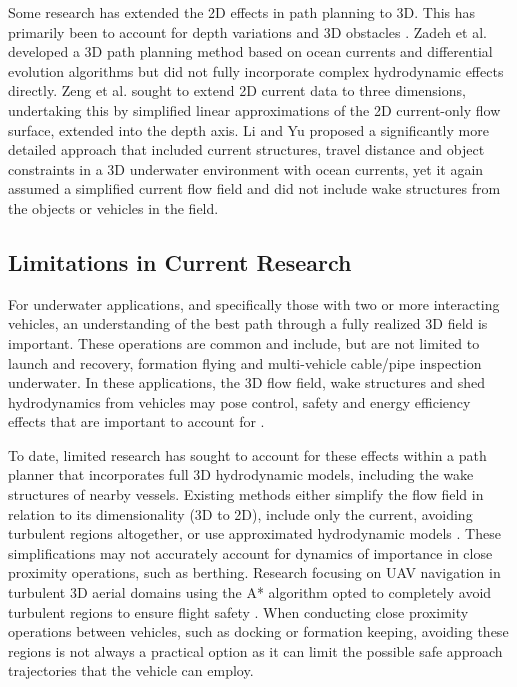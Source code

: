 \documentclass[final,5p,times,twocolumn]{elsarticle}
\begin{document}
Some research has extended the 2D effects in path planning to 3D. This has primarily been to account for depth variations and 3D obstacles \cite{Zadeh2018, Yi2023}. Zadeh et al. \cite{Zadeh2018} developed a 3D path planning method based on ocean currents and differential evolution algorithms but did not fully incorporate complex hydrodynamic effects directly. Zeng et al.  \cite{KarlSuggested} sought to extend 2D current data to three dimensions, undertaking this by simplified linear approximations of the 2D current-only flow surface, extended into the depth axis. Li and Yu \cite{Yi2023} proposed a significantly more detailed approach that included current structures, travel distance and object constraints in a 3D underwater environment with ocean currents, yet it again assumed a simplified current flow field and did not include wake structures from the objects or vehicles in the field.

\subsection{Limitations in Current Research} %

For underwater applications, and specifically those with two or more interacting vehicles, an understanding of the best path through a fully realized 3D field is important. These operations are common and include, but are not limited to launch and recovery, formation flying and multi-vehicle cable/pipe inspection underwater. In these applications, the 3D flow field, wake structures and shed hydrodynamics from vehicles may pose control, safety and energy efficiency effects that are important to account for \cite{Bhattacharyya2011}.

To date, limited research has sought to account for these effects within a path planner that incorporates full 3D hydrodynamic models, including the wake structures of nearby vessels. Existing methods either simplify the flow field in relation to its dimensionality (3D to 2D), include only the current, avoiding turbulent regions altogether, or use approximated hydrodynamic models \cite{GZhang2022, Yang2019}. These simplifications may not accurately account for dynamics of importance in close proximity operations, such as berthing. Research focusing on UAV navigation in turbulent 3D aerial domains using the A* algorithm opted to completely avoid turbulent regions to ensure flight safety \cite{Pensado2024}. When conducting close proximity operations between vehicles, such as docking or formation keeping, avoiding these regions is not always a practical option as it can limit the possible safe approach trajectories that the vehicle can employ. 
\end{document}
